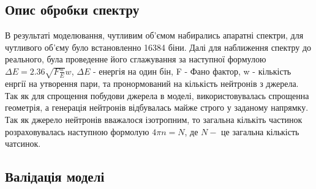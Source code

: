 \documentclass[a4paper, 14pt]{article}
\numberwithin{equation}{section}
\numberwithin{table}{section}
\begin{document}
\subsection{Опис обробки спектру}

В результаті моделювання, чутливим об'ємом набирались апаратні спектри, для чутливого об'єму було встановленно 16384 біни. Далі для наближення спектру до реального, була проведенне його сглажування за наступної формулою $\Delta{E} = 2.36 \sqrt{F  \frac{w}{E}}  w$, $\Delta{E}$ - енергія на один бін, F - Фано фактор, w - кількість енргії на утворення пари, та пронормований на кількість нейтронів з джерела. Так як для спрощення побудови джерела в моделі, використовувалась спрощенна геометрія, а генерація нейтронів відбувалась майже строго у заданому напрямку. Так як джерело нейтронів вважалося ізотропним, то загальна кількіть частинок розраховувалась наступною формолую $ 4 \pi n = N$, де $N -$ це загальна кількість чатсинок.

\subsection{Валідація моделі}
\end{document}
